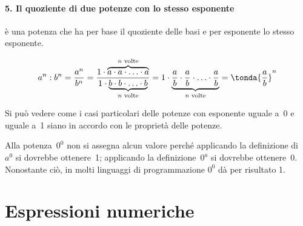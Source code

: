\vspace{-1.5em}
\paragraph{5. Il quoziente di due potenze con lo stesso esponente} 
è una potenza che ha per base il quoziente delle basi e per esponente lo 
stesso esponente.

\[a^n : b^n = \frac{a^n}{b^n} = 
  \frac{1 \cdot \overbrace{a\cdot a\cdot\ldots\cdot a}^{n\text{ volte}} }
       {1 \cdot \underbrace{b\cdot b\cdot\ldots\cdot b}_{n\text{ volte}}}=
  1 \cdot \underbrace{\frac{a}{b}\cdot \frac{a}{b}\cdot\ldots\cdot
              \frac{a}{b}}_{n\text{ volte}}=
   \tonda{\frac{a}{b}}^n\]


\bigskip %

Si può vedere come i casi particolari delle potenze con esponente uguale a~0 
e uguale a~1 siano in accordo con le proprietà delle potenze.

\vspace{-1.5em}

\begin{osservazione}{}{} 
Alla potenza~\(0^0\) non si assegna alcun valore perché applicando la 
definizione di~\(a^0\) si dovrebbe ottenere~1;
applicando la definizione~\(0^a\) si dovrebbe ottenere~0. Nonostante ciò, in 
molti linguaggi di programmazione \(0^0\) dà per risultato 1.
\end{osservazione}


\section{Espressioni numeriche}
\label{sec:nat_espressioni}

